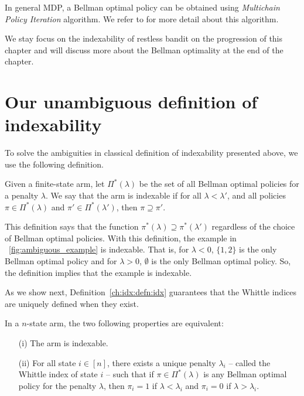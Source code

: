 In general MDP, a Bellman optimal policy can be obtained using \emph{Multichain Policy Iteration} algorithm.
We refer to \cite[Section~9.2.1]{puterman2014markov} for more detail about this algorithm.

We stay focus on the indexability of restless bandit on the progression of this chapter and will discuss more about the Bellman optimality at the end of the chapter.

\section{Our unambiguous definition of indexability}
\label{ch:idx:sec:idx}

To solve the ambiguities in classical definition of indexability presented above, we use the following definition.  
\begin{defn}
    Given a finite-state arm, let $\Pi^*(\lambda)$ be the set of all Bellman optimal policies for a penalty $\lambda$.
    We say that the arm is indexable if for all $\lambda<\lambda'$, and all policies $\pi\in\Pi^*(\lambda)$ and $\pi'\in\Pi^*(\lambda')$, then $\pi\supseteq\pi'$.
    \label{ch:idx:defn:idx}
\end{defn}
This definition says that the function $\pi^*(\lambda)\supseteq\pi^*(\lambda')$ regardless of the choice of Bellman optimal policies.
With this definition, the example in \figurename~\ref{fig:ambiguous_example} is indexable.
That is, for $\lambda<0$, $\{1,2\}$ is the only Bellman optimal policy and for $\lambda>0$, $\emptyset$ is the only Bellman optimal policy.
So, the definition implies that the example is indexable.

As we show next, Definition~\ref{ch:idx:defn:idx} guarantees that the Whittle indices are uniquely defined when they exist.
\begin{lem}
    \label{ch:idx:lem:idx}
    In a $n$-state arm, the two following properties are equivalent: 
    \begin{enumerate}
        \item[(i)] The arm is indexable.
        \item[(ii)] For all state $i\in[n]$, there exists a unique penalty $\lambda_i$ -- called the Whittle index of state $i$ -- such that if $\pi\in\Pi^*(\lambda)$ is any Bellman optimal policy for the penalty $\lambda$, then $\pi_i=1$ if $\lambda<\lambda_i$ and $\pi_i=0$ if $\lambda>\lambda_i$. 
    \end{enumerate}
\end{lem}

